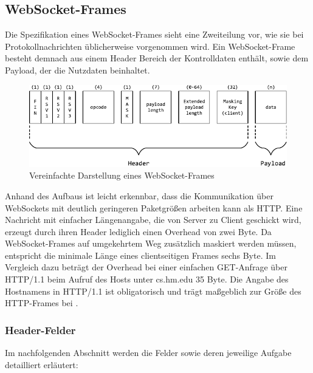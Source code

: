 \documentclass[11pt,a4paper,titlepage]{scrartcl}
\numberwithin{equation}{section}
\begin{document}
\subsection{WebSocket-Frames}\label{subsec:wsFrames}
Die Spezifikation eines WebSocket-Frames sieht eine Zweiteilung vor, wie sie bei Protokollnachrichten üblicherweise vorgenommen wird. Ein WebSocket-Frame besteht demnach aus einem Header Bereich der Kontrolldaten enthält, sowie dem Payload, der die Nutzdaten beinhaltet.\vspace{2mm}
\begin{figure}[ht] \label{fig:wsFrame}
	\begin{center}
		\includegraphics[scale=1.25]{img/frame.pdf}
		\caption{Vereinfachte Darstellung eines WebSocket-Frames}
	\end{center}
\end{figure}
Anhand des Aufbaus ist leicht erkennbar, dass die Kommunikation über WebSockets mit deutlich geringeren Paketgrößen arbeiten kann als HTTP. Eine Nachricht mit einfacher Längenangabe, die von Server zu Client geschickt wird, erzeugt durch ihren Header lediglich einen Overhead von zwei Byte. Da WebSocket-Frames auf umgekehrtem Weg zusätzlich maskiert werden müssen, entspricht die minimale Länge eines clientseitigen Frames sechs Byte. Im Vergleich dazu beträgt der Overhead bei einer einfachen GET-Anfrage über HTTP/1.1 beim Aufruf des Hosts unter cs.hm.edu 35 Byte. Die Angabe des Hostnamens in HTTP/1.1 ist obligatorisch und trägt maßgeblich zur Größe des HTTP-Frames bei \autocite[128]{leach_hypertext_1999}. 

\subsubsection{Header-Felder}\label{subsubsec:wsHeader}
Im nachfolgenden Abschnitt werden die Felder sowie deren jeweilige Aufgabe detailliert erläutert:
\end{document}

